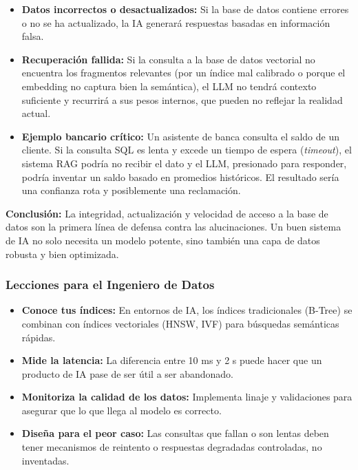 \documentclass[12pt,a4paper,openany,oneside]{book}
\begin{document}
\begin{itemize}
    \item \textbf{Datos incorrectos o desactualizados:} Si la base de datos contiene errores o no se ha actualizado, la IA generará respuestas basadas en información falsa.
    \item \textbf{Recuperación fallida:} Si la consulta a la base de datos vectorial no encuentra los fragmentos relevantes (por un índice mal calibrado o porque el embedding no captura bien la semántica), el LLM no tendrá contexto suficiente y recurrirá a sus pesos internos, que pueden no reflejar la realidad actual.
    \item \textbf{Ejemplo bancario crítico:} Un asistente de banca consulta el saldo de un cliente. Si la consulta SQL es lenta y excede un tiempo de espera (\textit{timeout}), el sistema RAG podría no recibir el dato y el LLM, presionado para responder, podría inventar un saldo basado en promedios históricos. El resultado sería una confianza rota y posiblemente una reclamación.
\end{itemize}

\textbf{Conclusión:} La integridad, actualización y velocidad de acceso a la base de datos son la primera línea de defensa contra las alucinaciones. Un buen sistema de IA no solo necesita un modelo potente, sino también una capa de datos robusta y bien optimizada.

\subsubsection{Lecciones para el Ingeniero de Datos}
\begin{itemize}
    \item \textbf{Conoce tus índices:} En entornos de IA, los índices tradicionales (B-Tree) se combinan con índices vectoriales (HNSW, IVF) para búsquedas semánticas rápidas.
    \item \textbf{Mide la latencia:} La diferencia entre 10 ms y 2 s puede hacer que un producto de IA pase de ser útil a ser abandonado.
    \item \textbf{Monitoriza la calidad de los datos:} Implementa linaje y validaciones para asegurar que lo que llega al modelo es correcto.
    \item \textbf{Diseña para el peor caso:} Las consultas que fallan o son lentas deben tener mecanismos de reintento o respuestas degradadas controladas, no inventadas.
\end{itemize}
\end{document}
